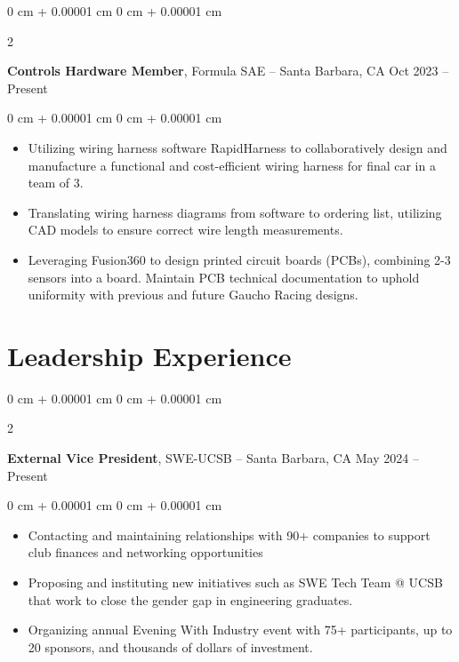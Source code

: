 \documentclass[10pt, letterpaper]{article}
\newenvironment{highlights}{
    \begin{itemize}[
        topsep=0.10 cm,
        parsep=0.10 cm,
        partopsep=0pt,
        itemsep=0pt,
        leftmargin=0 cm + 10pt
    ]
}{
    \end{itemize}
} %
\newenvironment{onecolentry}{
    \begin{adjustwidth}{
        0 cm + 0.00001 cm
    }{
        0 cm + 0.00001 cm
    }
}{
    \end{adjustwidth}
} %
\newenvironment{twocolentry}[2][]{
    \onecolentry
    \def\secondColumn{#2}
    \setcolumnwidth{\fill, 4.5 cm}
    \begin{paracol}{2}
}{
    \switchcolumn \raggedleft \secondColumn
    \end{paracol}
    \endonecolentry
} %
\begin{document}
        \vspace{0.2 cm}

    \vspace{0.2 cm}


    \begin{twocolentry}{
        Oct 2023 – Present
    }
    
    \textbf{Controls Hardware Member}, Formula SAE -- Santa Barbara, CA\end{twocolentry}

    \vspace{0.10 cm}
    \begin{onecolentry}
        \begin{highlights}
            \item Utilizing wiring harness software RapidHarness to collaboratively design and manufacture a functional and cost-efficient wiring harness for final car in a team of 3.
            \item Translating wiring harness diagrams from software to ordering list, utilizing CAD models to ensure correct wire length measurements. 
            \item Leveraging Fusion360 to design printed circuit boards (PCBs), combining 2-3 sensors into a board. Maintain PCB technical documentation to uphold uniformity with previous and future Gaucho Racing designs.
        \end{highlights}
    \end{onecolentry}





    \section{Leadership Experience}

        \begin{twocolentry}{
            May 2024 – Present
        }
            \textbf{External Vice President}, SWE-UCSB -- Santa Barbara, CA\end{twocolentry}

        \vspace{0.10 cm}
        \begin{onecolentry}
            \begin{highlights}
                \item Contacting and maintaining relationships with 90+ companies to support club finances and networking opportunities 
                \item Proposing and instituting new initiatives such as SWE Tech Team @ UCSB that work to close the gender gap in engineering graduates.
                \item Organizing annual Evening With Industry event with 75+ participants, up to 20 sponsors, and thousands of dollars of investment.
            \end{highlights}
        \end{onecolentry}
\end{document}
